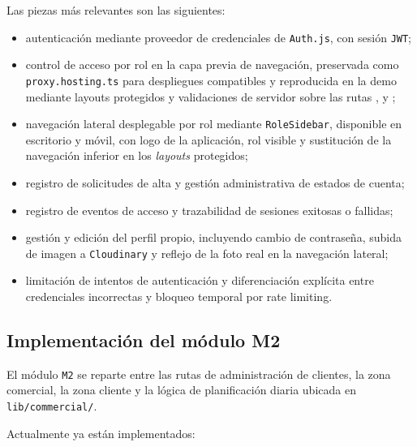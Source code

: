 Las piezas más relevantes son las siguientes:

\begin{itemize}
    \item autenticación mediante proveedor de credenciales de \texttt{Auth.js}, con sesión \texttt{JWT};
    \item control de acceso por rol en la capa previa de navegación, preservada como \texttt{proxy.hosting.ts} para despliegues compatibles y reproducida en la demo mediante layouts protegidos y validaciones de servidor sobre las rutas ,  y ;
    \item navegación lateral desplegable por rol mediante \texttt{RoleSidebar}, disponible en escritorio y móvil, con logo de la aplicación, rol visible y sustitución de la navegación inferior en los \textit{layouts} protegidos;
    \item registro de solicitudes de alta y gestión administrativa de estados de cuenta;
    \item registro de eventos de acceso y trazabilidad de sesiones exitosas o fallidas;
    \item gestión y edición del perfil propio, incluyendo cambio de contraseña, subida de imagen a \texttt{Cloudinary} y reflejo de la foto real en la navegación lateral;
    \item limitación de intentos de autenticación y diferenciación explícita entre credenciales incorrectas y bloqueo temporal por rate limiting.
\end{itemize}

\subsection{Implementación del módulo M2}

El módulo \texttt{M2} se reparte entre las rutas de administración de clientes, la zona comercial, la zona cliente y la lógica de planificación diaria ubicada en \texttt{lib/commercial/}.

Actualmente ya están implementados:

